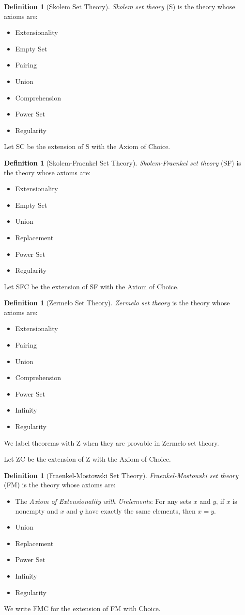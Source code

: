 \documentclass{book}
\theoremstyle{definition}
\newtheorem{df}[ax]{Definition}
\begin{document}
\begin{df}[Skolem Set Theory]
\emph{Skolem set theory} (S) is the theory whose axioms are:
\begin{itemize}
\item Extensionality
\item Empty Set
\item Pairing
\item Union
\item Comprehension
\item Power Set
\item Regularity
\end{itemize}
Let SC be the extension of S with the Axiom of Choice.
\end{df}

\begin{df}[Skolem-Fraenkel Set Theory]
\emph{Skolem-Fraenkel set theory} (SF) is the theory whose axioms are:
\begin{itemize}
\item Extensionality
\item Empty Set
\item Union
\item Replacement
\item Power Set
\item Regularity
\end{itemize}

Let SFC be the extension of SF with the Axiom of Choice.
\end{df}

\begin{df}[Zermelo Set Theory]
\emph{Zermelo set theory} is the theory whose axioms are:
\begin{itemize}
\item Extensionality
\item Pairing
\item Union
\item Comprehension
\item Power Set
\item Infinity
\item Regularity
\end{itemize}
We label theorems with Z when they are provable in Zermelo set theory.

Let ZC be the extension of Z with the Axiom of Choice.
\end{df}

\begin{df}[Fraenkel-Mostowski Set Theory]
\emph{Fraenkel-Mostowski set theory} (FM) is the theory whose axioms are:
\begin{itemize}
\item The \emph{Axiom of Extensionality with Urelements}: For any sets $x$ and $y$, if $x$ is nonempty and $x$ and $y$ have exactly the same elements, then $x = y$.
\item Union
\item Replacement
\item Power Set
\item Infinity
\item Regularity
\end{itemize}
We write FMC for the extension of FM with Choice.
\end{df}
\end{document}
